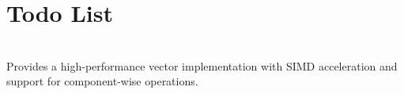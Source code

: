 \chapter{Todo List }
\hypertarget{todo}{}\label{todo}

\begin{DoxyRefList}
\item[{\parbox[t]{\linewidth}{File \doxylink{_vector4_d_8h}{Vector4D.h} }}]\hfill \\
\label{todo__todo000001}%
%
Provides a high-\/performance vector implementation with SIMD acceleration and support for component-\/wise operations.
\end{DoxyRefList}